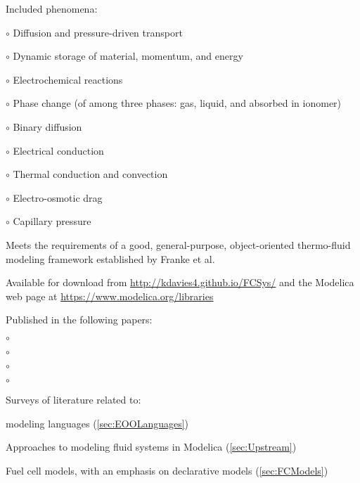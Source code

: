 \begin{itemize*}
\begin{itemize*}
      \item Included phenomena:
        \begin{itemize*}
          \item[$\circ$] Diffusion and pressure-driven transport
          \item[$\circ$] Dynamic storage of material, momentum, and energy
          \item[$\circ$] Electrochemical reactions
          \item[$\circ$] Phase change (of  among three phases: gas, liquid, and absorbed in ionomer)
          \item[$\circ$] Binary diffusion
          \item[$\circ$] Electrical conduction
          \item[$\circ$] Thermal conduction and convection
          \item[$\circ$] Electro-osmotic drag
          \item[$\circ$] Capillary pressure
        \end{itemize*}%

      \item Meets the requirements of a good, general-purpose, object-oriented thermo-fluid modeling framework established by Franke et al.~\cite{Franke2009}

      \item Available for download from \url{http://kdavies4.github.io/FCSys/} and the Modelica web page at \url{https://www.modelica.org/libraries}

      \item Published in the following papers:\\
      \vspace{-4ex}
      \begin{itemize*}%
        \item[$\circ$] 
        \item[$\circ$] 
        \item[$\circ$] 
        \item[$\circ$] 
      \end{itemize*}%
    \end{itemize*}%

  \item Surveys of literature related to: 
    \begin{itemize*}
      \item {} modeling languages (\autoref{sec:EOOLanguages})
      \item Approaches to modeling fluid systems in Modelica (\autoref{sec:Upstream})
      \item Fuel cell models, with an emphasis on declarative models (\autoref{sec:FCModels})
    \end{itemize*}%


\end{itemize*}
